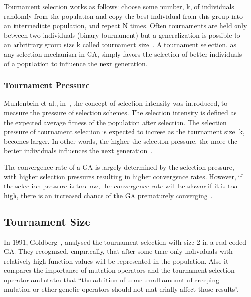Tournament selection works as follows: choose some number, k, of individuals randomly from the population and copy the best individual from this group into an intermediate population, and repeat N times. Often tournaments are held only between two individuals (binary tournament) but a generalization is possible to an arbritrary group size k called tournament size~\cite{blickle1995mathematical}. A tournament selection, as any selection mechanism in GA, simply favors the selection of better individuals of a population to influence the next generation. 



\subsubsection{Tournament Pressure}\label{sec:background:tournament_pressure} 
Muhlenbein et al., in~\cite{muhlenbein1993predictive}, the concept of selection intensity was introduced, to measure the pressure of selection schemes. The selection intensity is defined as the expected average fitness of the population after selection. The selection pressure of tournament selection is expected to increse as the tournament size, k, becomes larger. In other words, the higher the selection pressure, the more the better individuals influences the next generation~\cite{miller1995genetic}.  

The convergence rate of a GA is largely determined by the selection pressure, with higher selection pressures resulting in higher convergence rates. However, if the selection pressure is too low, the convergence rate will be slowor if it is too high, there is an increased chance of the GA prematurely converging~\cite{miller1995genetic}.  

\subsection{Tournament Size}\label{sec:background:tournament_size} 

In 1991, Goldberg~\cite{goldberg1991real}, analysed the tournament selection with size 2 in a real-coded GA. They recognized, empirically, that after some time only individuals with relatively high function values will be represented in the population. Also it compares the importance of mutation operators and the tournament selection operator and states that ``the addition of some small amount of creeping mutation or other genetic operators should not mat erially affect these results''.

